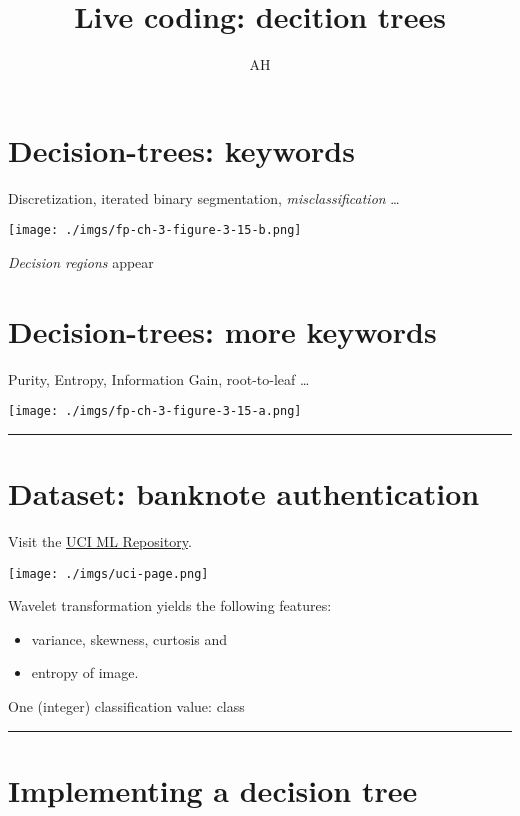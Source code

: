 \documentclass[
  a4paper,
  DIV=11,
  numbers=noendperiod]{scrartcl}
\title{Live coding: decition trees}
\author{AH}
\date{}
\begin{document}
\maketitle

\section{Decision-trees: keywords}\label{decision-trees-keywords}

Discretization, iterated binary segmentation, \emph{misclassification}
\ldots{}

\texttt{[image: ./imgs/fp-ch-3-figure-3-15-b.png]}

\emph{Decision regions} appear

\section{Decision-trees: more
keywords}\label{decision-trees-more-keywords}

Purity, Entropy, Information Gain, root-to-leaf \ldots{}

\texttt{[image: ./imgs/fp-ch-3-figure-3-15-a.png]}

\begin{center}\rule{0.5\linewidth}{0.5pt}\end{center}

\section{Dataset: banknote
authentication}\label{dataset-banknote-authentication}

Visit the
\href{https://archive.ics.uci.edu/ml/datasets/banknote+authentication}{UCI
ML Repository}.

\texttt{[image: ./imgs/uci-page.png]}

Wavelet transformation yields the following features:

\begin{itemize}
\item
  variance, skewness, curtosis and
\item
  entropy of image.
\end{itemize}

One (integer) classification value: class

\begin{center}\rule{0.5\linewidth}{0.5pt}\end{center}

\section{Implementing a decision
tree}\label{implementing-a-decision-tree}
\end{document}
